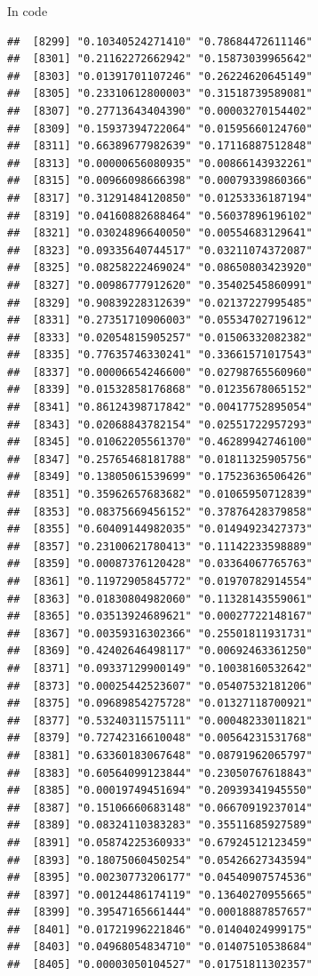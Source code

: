 \documentclass[ignorenonframetext,]{beamer}
\begin{document}
\begin{frame}[fragile]{In code}
\begin{verbatim}
##  [8299] "0.10340524271410" "0.78684472611146"
##  [8301] "0.21162272662942" "0.15873039965642"
##  [8303] "0.01391701107246" "0.26224620645149"
##  [8305] "0.23310612800003" "0.31518739589081"
##  [8307] "0.27713643404390" "0.00003270154402"
##  [8309] "0.15937394722064" "0.01595660124760"
##  [8311] "0.66389677982639" "0.17116887512848"
##  [8313] "0.00000656080935" "0.00866143932261"
##  [8315] "0.00966098666398" "0.00079339860366"
##  [8317] "0.31291484120850" "0.01253336187194"
##  [8319] "0.04160882688464" "0.56037896196102"
##  [8321] "0.03024896640050" "0.00554683129641"
##  [8323] "0.09335640744517" "0.03211074372087"
##  [8325] "0.08258222469024" "0.08650803423920"
##  [8327] "0.00986777912620" "0.35402545860991"
##  [8329] "0.90839228312639" "0.02137227995485"
##  [8331] "0.27351710906003" "0.05534702719612"
##  [8333] "0.02054815905257" "0.01506332082382"
##  [8335] "0.77635746330241" "0.33661571017543"
##  [8337] "0.00006654246600" "0.02798765560960"
##  [8339] "0.01532858176868" "0.01235678065152"
##  [8341] "0.86124398717842" "0.00417752895054"
##  [8343] "0.02068843782154" "0.02551722957293"
##  [8345] "0.01062205561370" "0.46289942746100"
##  [8347] "0.25765468181788" "0.01811325905756"
##  [8349] "0.13805061539699" "0.17523636506426"
##  [8351] "0.35962657683682" "0.01065950712839"
##  [8353] "0.08375669456152" "0.37876428379858"
##  [8355] "0.60409144982035" "0.01494923427373"
##  [8357] "0.23100621780413" "0.11142233598889"
##  [8359] "0.00087376120428" "0.03364067765763"
##  [8361] "0.11972905845772" "0.01970782914554"
##  [8363] "0.01830804982060" "0.11328143559061"
##  [8365] "0.03513924689621" "0.00027722148167"
##  [8367] "0.00359316302366" "0.25501811931731"
##  [8369] "0.42402646498117" "0.00692463361250"
##  [8371] "0.09337129900149" "0.10038160532642"
##  [8373] "0.00025442523607" "0.05407532181206"
##  [8375] "0.09689854275728" "0.01327118700921"
##  [8377] "0.53240311575111" "0.00048233011821"
##  [8379] "0.72742316610048" "0.00564231531768"
##  [8381] "0.63360183067648" "0.08791962065797"
##  [8383] "0.60564099123844" "0.23050767618843"
##  [8385] "0.00019749451694" "0.20939341945550"
##  [8387] "0.15106660683148" "0.06670919237014"
##  [8389] "0.08324110383283" "0.35511685927589"
##  [8391] "0.05874225360933" "0.67924512123459"
##  [8393] "0.18075060450254" "0.05426627343594"
##  [8395] "0.00230773206177" "0.04540907574536"
##  [8397] "0.00124486174119" "0.13640270955665"
##  [8399] "0.39547165661444" "0.00018887857657"
##  [8401] "0.01721996221846" "0.01404024999175"
##  [8403] "0.04968054834710" "0.01407510538684"
##  [8405] "0.00003050104527" "0.01751811302357"

\end{verbatim}
\end{frame}
\end{document}
